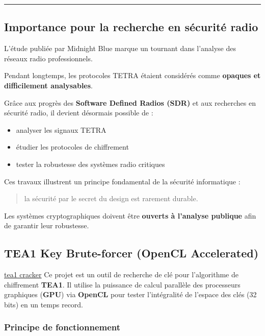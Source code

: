 \documentclass[
  french,
]{article}
\providecommand{\tightlist}{%
  \setlength{\itemsep}{0pt}\setlength{\parskip}{0pt}}
\begin{document}
\begin{center}\rule{0.5\linewidth}{0.5pt}\end{center}

\subsection{Importance pour la recherche en sécurité
radio}\label{importance-pour-la-recherche-en-suxe9curituxe9-radio}

L'étude publiée par Midnight Blue marque un tournant dans l'analyse des
réseaux radio professionnels.

Pendant longtemps, les protocoles TETRA étaient considérés comme
\textbf{opaques et difficilement analysables}.

Grâce aux progrès des \textbf{Software Defined Radios (SDR)} et aux
recherches en sécurité radio, il devient désormais possible de :

\begin{itemize}
\tightlist
\item
  analyser les signaux TETRA
\item
  étudier les protocoles de chiffrement
\item
  tester la robustesse des systèmes radio critiques
\end{itemize}

Ces travaux illustrent un principe fondamental de la sécurité
informatique :

\begin{quote}
la sécurité par le secret du design est rarement durable.
\end{quote}

Les systèmes cryptographiques doivent être \textbf{ouverts à l'analyse
publique} afin de garantir leur robustesse.

\subsection{TEA1 Key Brute-forcer (OpenCL
Accelerated)}\label{tea1-key-brute-forcer-opencl-accelerated}

\href{https://github.com/bbaranoff/tea1-cracker}{tea1 cracker} Ce projet
est un outil de recherche de clé pour l'algorithme de chiffrement
\textbf{TEA1}. Il utilise la puissance de calcul parallèle des
processeurs graphiques (\textbf{GPU}) via \textbf{OpenCL} pour tester
l'intégralité de l'espace des clés (32 bits) en un temps record.

\subsubsection{Principe de
fonctionnement}\label{principe-de-fonctionnement-1}
\end{document}
